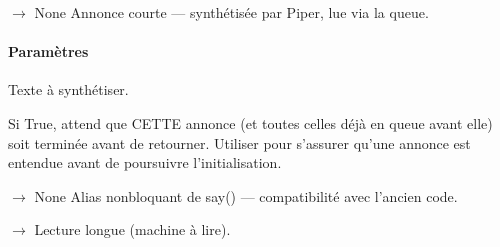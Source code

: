 \documentclass[letterpaper,10pt,french]{sphinxmanual}
\begin{document}
\begin{fulllineitems}
\begin{fulllineitems}
\end{fulllineitems}


\begin{fulllineitems}
\label{\detokenize{api/core:core.speaker.Speaker.say}}
\pysigstartsignatures
\pysiglinewithargsret
{}
{\sphinxparamcomma {}}
{{ $\rightarrow$ None}}
\pysigstopsignatures
\sphinxAtStartPar
Annonce courte — synthétisée par Piper, lue via la queue.


\paragraph{Paramètres}
\label{\detokenize{api/core:id4}}\begin{description}
\sphinxAtStartPar
Texte à synthétiser.

\sphinxAtStartPar
Si True, attend que CETTE annonce (et toutes celles déjà
en queue avant elle) soit terminée avant de retourner.
Utiliser pour s’assurer qu’une annonce est entendue avant
de poursuivre l’initialisation.

\end{description}

\end{fulllineitems}


\begin{fulllineitems}
\label{\detokenize{api/core:core.speaker.Speaker.speak}}
\pysigstartsignatures
\pysiglinewithargsret
{}
{}
{{ $\rightarrow$ None}}
\pysigstopsignatures
\sphinxAtStartPar
Alias non\sphinxhyphen{}bloquant de say() — compatibilité avec l’ancien code.

\end{fulllineitems}


\begin{fulllineitems}
\label{\detokenize{api/core:core.speaker.Speaker.play}}
\pysigstartsignatures
\pysiglinewithargsret
{}
{}
{{ $\rightarrow$ {\hyperref[\detokenize{api/core:core.speaker.PlaybackHandle}]{}}}}
\pysigstopsignatures
\sphinxAtStartPar
Lecture longue (machine à lire).


\end{fulllineitems}
\end{fulllineitems}
\end{document}
